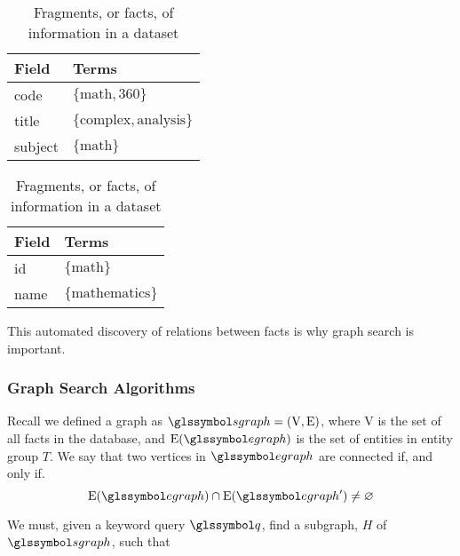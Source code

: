 			\begin{table}[H]
				\begin{subtable}[b]{0.5\linewidth}
					\centering
					
					\begin{tabular}{ll}
						\toprule
						Field & Terms \\
						\midrule
						code & \(\{\text{math}, \text{360}\}\) \\
						title & \(\{\text{complex}, \text{analysis}\}\) \\
						subject & \(\{\text{math}\}\) \\
						\bottomrule
					\end{tabular}
					
					\caption{Fact representing a Course}
					\label{subtbl:fact-course}
				\end{subtable}
				\begin{subtable}[b]{0.5\linewidth}
					\centering
					
					\begin{tabular}{ll}
						\toprule
						Field & Terms \\
						\midrule
						id & \(\{\text{math}\}\) \\
						name & \(\{\text{mathematics}\}\) \\
						\bottomrule
					\end{tabular}
					
					\caption{Fact representing a Subject}
					\label{subtbl:fact-subject}
				\end{subtable}
				
				\caption{Fragments, or facts, of information in a dataset}
				\label{tbl:facts}
			\end{table}
			
			This automated discovery of relations between facts is why graph search is important.
		
		\subsubsection{Graph Search Algorithms}
			Recall we defined a graph as \(\sgraph{} = (\text{V}, \text{E})\), where \(\text{V}\) is the set of all facts in the database, and \(\text{E}(\egraph{})\) is the set of entities in entity group \(T\).  We say that two vertices in \(\egraph{}\) are connected if, and only if.
			\[
				\text{E}(\egraph{}) \cap \text{E}(\egraph{}') \not= \emptyset
			\]
			
			We must, given a keyword query \(\q\), find a subgraph, \(H\) of \(\sgraph{}\), such that
			
